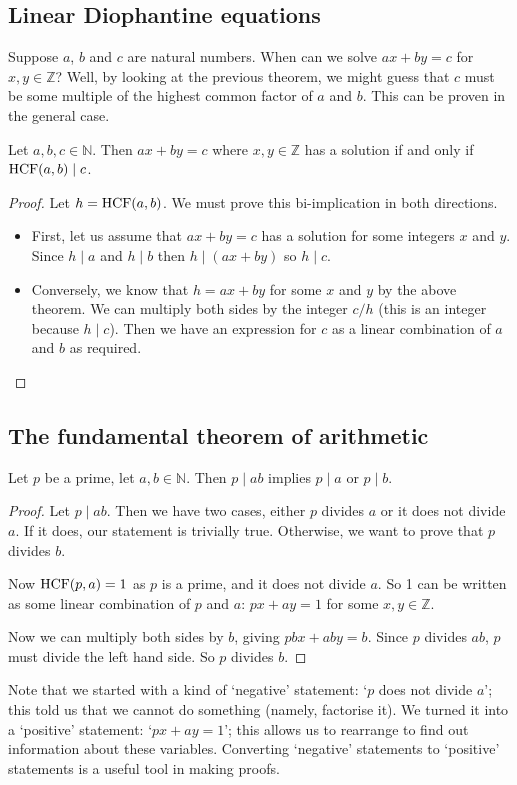 \subsection{Linear Diophantine equations}
Suppose \(a\), \(b\) and \(c\) are natural numbers.
When can we solve \(ax + by = c\) for \(x, y \in \mathbb Z\)?
Well, by looking at the previous theorem, we might guess that \(c\) must be some multiple of the highest common factor of \(a\) and \(b\).
This can be proven in the general case.
\begin{corollary}
	Let \(a, b, c \in \mathbb N\).
	Then \(ax + by = c\) where \(x, y \in \mathbb Z\) has a solution if and only if \(\operatorname{HCF}(a, b) \mid c\).
\end{corollary}
\begin{proof}
	Let \(h = \operatorname{HCF}(a, b)\).
	We must prove this bi-implication in both directions.
	\begin{itemize}
		\item First, let us assume that \(ax+by=c\) has a solution for some integers \(x\) and \(y\).
		      Since \(h \mid a\) and \(h \mid b\) then \(h \mid (ax+by)\) so \(h \mid c\).
		\item Conversely, we know that \(h = ax + by\) for some \(x\) and \(y\) by the above theorem.
		      We can multiply both sides by the integer \(c/h\) (this is an integer because \(h \mid c\)).
		      Then we have an expression for \(c\) as a linear combination of \(a\) and \(b\) as required.
	\end{itemize}
\end{proof}

\subsection{The fundamental theorem of arithmetic}
\begin{lemma}
	Let \(p\) be a prime, let \(a, b \in \mathbb N\).
	Then \(p \mid ab\) implies \(p \mid a\) or \(p \mid b\).
\end{lemma}
\begin{proof}
	Let \(p \mid ab\).
	Then we have two cases, either \(p\) divides \(a\) or it does not divide \(a\).
	If it does, our statement is trivially true.
	Otherwise, we want to prove that \(p\) divides \(b\).

	Now \(\operatorname{HCF}(p, a)=1\) as \(p\) is a prime, and it does not divide \(a\).
	So 1 can be written as some linear combination of \(p\) and \(a\): \(px + ay = 1\) for some \(x, y \in \mathbb Z\).

	Now we can multiply both sides by \(b\), giving \(pbx + aby = b\).
	Since \(p\) divides \(ab\), \(p\) must divide the left hand side.
	So \(p\) divides \(b\).
\end{proof}
Note that we started with a kind of `negative' statement: `\(p\) does not divide \(a\)'; this told us that we cannot do something (namely, factorise it).
We turned it into a `positive' statement: `\(px + ay = 1\)'; this allows us to rearrange to find out information about these variables.
Converting `negative' statements to `positive' statements is a useful tool in making proofs.

